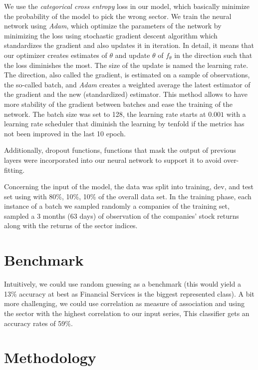 \documentclass[a4paper,twoside]{article}
\begin{document}
We use the \emph{categorical cross entropy} loss in our model, which basically
minimize the probability of the model to pick the wrong sector. We train the
neural network using \emph{Adam}, which optimize the parameters of the network by
minimizing the loss using stochastic gradient descent algorithm which
standardizes the gradient and also updates it in iteration. In detail, it
means that our optimizer creates estimates of \(\theta\) and update \(\theta\) of
\(f_\theta\) in the direction such that the loss diminishes the most. The size
of the update is named the learning rate. The direction, also called the
gradient, is estimated on a sample of observations, the so-called batch, and
\emph{Adam} creates a weighted average the latest estimator of the gradient and the
new (standardized) estimator. This method allows to have more stability of the
gradient between batches and ease the training of the network. The batch size
was set to 128, the learning rate starts at \(0.001\) with a learning rate
scheduler that diminish the learning by tenfold if the metrics has not been
improved in the last 10 epoch.

Additionally, dropout functions, functions that mask the output of previous
layers were incorporated into our neural network to support it to avoid
over-fitting.

Concerning the input of the model, the data was split into training, dev, and
test set using with 80\%, 10\%, 10\% of the overall data set. In the training
phase, each instance of a batch we sampled randomly a companies of the training
set, sampled a 3 months (63 days) of observation of the companies' stock
returns along with the returns of the sector indices.

\section{Benchmark}
\label{sec:org9548d7c}

Intuitively, we could use random guessing as a benchmark (this would yield a
13\% accuracy at best as Financial Services is the biggest represented class).
A bit more challenging, we could use correlation as measure of association and
using the sector with the highest correlation to our input series, This
classifier gets an accuracy rates of 59\%.


\section{Methodology}
\label{sec:orgdf4002a}
\end{document}
